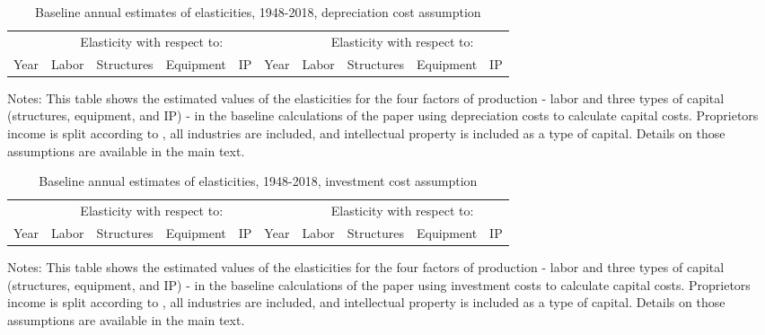 \documentclass[11pt]{article}
\begin{document}
\begin{table}[!htb]
\begin{center}
\label{TAB_annual_deprcost}
\caption{Baseline annual estimates of elasticities, 1948-2018, depreciation cost assumption}
{\footnotesize
\begin{tabularx}{\textwidth}{XXXXXXXXXX}
\midrule
& \multicolumn{4}{c}{Elasticity with respect to:} & & \multicolumn{4}{c}{Elasticity with respect to:} \\ \cmidrule(lr){2-5} \cmidrule(lr){7-10}
Year  & Labor  & Structures & Equipment & IP & Year  & Labor  & Structures & Equipment & IP \\ 
\midrule

\midrule
\end{tabularx}
}
\end{center}
{\footnotesize Notes: This table shows the estimated values of the elasticities for the four factors of production - labor and three types of capital (structures, equipment, and IP) - in the baseline calculations of the paper using depreciation costs to calculate capital costs. Proprietors income is split according to \cite{gommerupert2004}, all industries are included, and intellectual property is included as a type of capital. Details on those assumptions are available in the main text.}
\end{table}

\begin{table}[!htb]
\begin{center}
\label{TAB_annual_invcost}
\caption{Baseline annual estimates of elasticities, 1948-2018, investment cost assumption}
{\footnotesize
\begin{tabularx}{\textwidth}{XXXXXXXXXX}
\midrule
& \multicolumn{4}{c}{Elasticity with respect to:} & & \multicolumn{4}{c}{Elasticity with respect to:} \\ \cmidrule(lr){2-5} \cmidrule(lr){7-10}
Year  & Labor  & Structures & Equipment & IP & Year  & Labor  & Structures & Equipment & IP \\ 
\midrule

\midrule
\end{tabularx}
}
\end{center}
{\footnotesize Notes: This table shows the estimated values of the elasticities for the four factors of production - labor and three types of capital (structures, equipment, and IP) - in the baseline calculations of the paper using investment costs to calculate capital costs. Proprietors income is split according to \cite{gommerupert2004}, all industries are included, and intellectual property is included as a type of capital. Details on those assumptions are available in the main text.}
\end{table}
\end{document}
